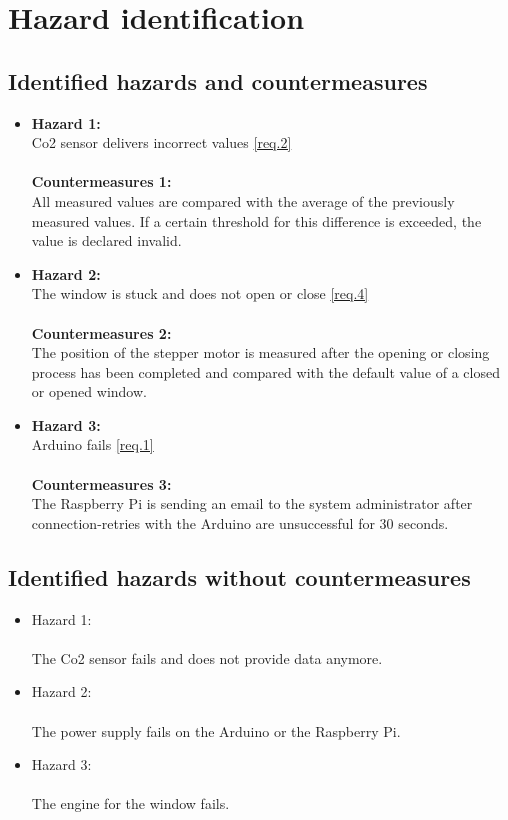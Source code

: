 \section{Hazard identification}
\label{chapter4}

\subsection{Identified hazards and countermeasures}


	\begin{itemize}
		\item \label{hazc.1} \textbf{Hazard 1:}
            \\	Co2 sensor delivers incorrect values \ref{req.2} \\\\
            \textbf{Countermeasures 1:}\\
            All measured values are compared with the average of the previously measured values. If a certain threshold for this difference is exceeded, the value is declared invalid.
		\item \label{hazc.2} \textbf{Hazard 2:}
            \\	The window is stuck and does not open or close \ref{req.4} \\\\
            \textbf{Countermeasures 2:}\\
            The position of the stepper motor is measured after the opening or closing process has been completed and compared with the default value of a closed or opened window.
		\item \label{hazc.3} \textbf{Hazard 3:}
            \\	Arduino fails \ref{req.1} \\\\
            \textbf{Countermeasures 3:}\\
            The Raspberry Pi is sending an email to the system administrator after connection-retries with the Arduino are unsuccessful for 30 seconds.
	\end{itemize}
	
\subsection{Identified hazards without countermeasures }

	\begin{itemize}
		\item \label{haz.1} Hazard 1: \\
            \\	The Co2 sensor fails and does not provide data anymore.
		\item \label{haz.2} Hazard 2: \\
            \\	The power supply fails on the Arduino or the Raspberry Pi.
		\item \label{haz.3} Hazard 3: \\
            \\	The engine for the window fails. \\
	\end{itemize}